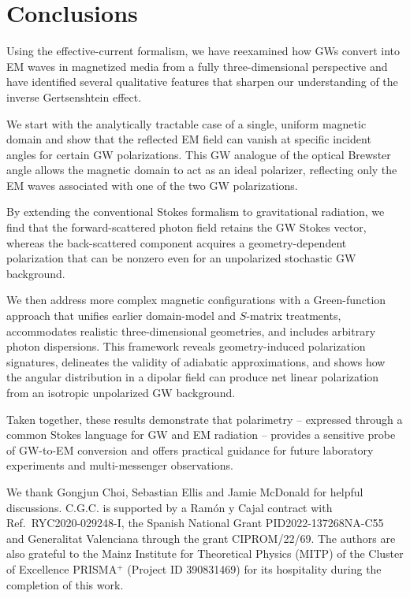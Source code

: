 \documentclass[a4paper,11pt]{article}
\begin{document}
\section{Conclusions}
\label{sec:conclusions}

Using the effective-current formalism, we have reexamined how GWs convert into EM waves in magnetized media from a fully three-dimensional perspective and have identified several qualitative features that sharpen our understanding of the inverse Gertsenshtein effect.

We start with the analytically tractable case of a single, uniform magnetic domain and show that the reflected EM field can vanish at specific incident angles for certain GW polarizations. This GW analogue of the optical Brewster angle allows the magnetic domain to act as an ideal polarizer, reflecting only the EM waves associated with one of the two GW polarizations.

By extending the conventional Stokes formalism to gravitational radiation, we find that the forward-scattered photon field retains the GW Stokes vector, whereas the back-scattered component acquires a geometry-dependent polarization that can be nonzero even for an unpolarized stochastic GW background.

We then address more complex magnetic configurations with a Green-function approach that unifies earlier domain-model and $S$-matrix treatments, accommodates realistic three-dimensional geometries, and includes arbitrary photon dispersions. This framework reveals geometry-induced polarization signatures, delineates the validity of adiabatic approximations, and shows how the angular distribution in a dipolar field can produce net linear polarization from an isotropic unpolarized GW background.

Taken together, these results demonstrate that polarimetry -- expressed through a common Stokes language for GW and EM radiation -- provides a sensitive probe of GW-to-EM conversion and offers practical guidance for future laboratory experiments and multi-messenger observations.



\acknowledgments


We thank  Gongjun Choi, Sebastian Ellis and Jamie McDonald for helpful discussions. 
%
 C.G.C. is supported by a Ramón y Cajal contract with Ref.~RYC2020-029248-I, the Spanish National Grant PID2022-137268NA-C55 and Generalitat Valenciana through the grant CIPROM/22/69.
%
The authors are also grateful to the Mainz Institute for Theoretical Physics (MITP) of the Cluster of Excellence PRISMA$^{+}$ (Project ID 390831469) for its hospitality  during the completion of this work.
\end{document}
